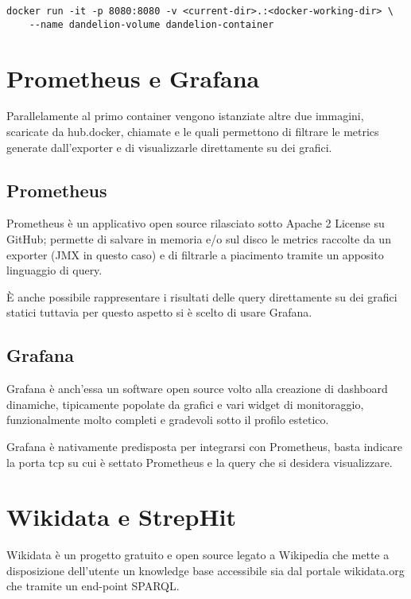 \begin{lstlisting}[style=YmlStyle, caption=Run Docker]
    docker run -it -p 8080:8080 -v <current-dir>.:<docker-working-dir> \
    --name dandelion-volume dandelion-container
\end{lstlisting}

\section{Prometheus e Grafana}
Parallelamente al primo container vengono istanziate altre due immagini, scaricate da hub.docker\cite{hub-docker}, chiamate \cite{docker-prometheus} 
e \code{grafana/grafana}\cite{docker-grafana} le quali permettono di filtrare le metrics generate dall'exporter e di visualizzarle direttamente su dei grafici. 

\subsection{Prometheus}
Prometheus\cite{prometheus} è un applicativo open source rilasciato sotto Apache 2 License su GitHub; permette di salvare in memoria e/o sul disco le metrics raccolte 
da un exporter (JMX in questo caso) e di filtrarle a piacimento tramite un apposito linguaggio di query. 

È anche possibile rappresentare i risultati delle query direttamente su dei grafici statici tuttavia per questo aspetto si è scelto di usare Grafana.

\subsection{Grafana}
Grafana\cite{grafana} è anch'essa un software open source volto alla creazione di dashboard dinamiche, tipicamente popolate da grafici e vari widget di monitoraggio, 
funzionalmente molto completi e gradevoli sotto il profilo estetico. 

Grafana è nativamente predisposta per integrarsi con Prometheus, basta indicare la porta tcp su cui è settato Prometheus e la query che si desidera visualizzare.   

\section{Wikidata e StrepHit}
Wikidata è un progetto gratuito e open source legato a Wikipedia che mette a disposizione dell'utente un knowledge base accessibile sia dal portale wikidata.org che tramite un end-point SPARQL.

